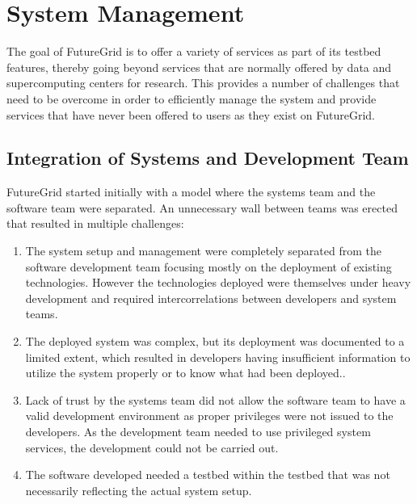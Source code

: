 \documentclass[graybox]{svmult}
\begin{document}



\section{System Management}\label{S:devops}


The goal of FutureGrid is to offer a variety of services as part of its testbed features, thereby going beyond services that are normally offered by data and supercomputing centers for research. This provides a number of challenges that need to be overcome in order to efficiently manage the system and provide services that have never been offered to users as they exist on FutureGrid.


\subsection{Integration of Systems and Development Team}


FutureGrid started initially with a model where the systems team and the software team were separated. An unnecessary wall between teams was erected that resulted in multiple challenges:


\begin{enumerate}


\item The system setup and management were completely separated from the software development team focusing mostly on the deployment of existing technologies. However the technologies deployed were themselves under heavy development and required intercorrelations between developers and system teams.


\item The deployed system was complex, but its deployment was documented to a limited extent, which resulted in developers having insufficient information to utilize the system properly or to know what had been deployed..


\item Lack of trust by the systems team did not allow the software team to have a valid development environment as proper privileges were not issued to the developers. As the development team needed to use privileged system services, the development could not be carried out.


\item The software developed needed a testbed within the testbed that was not necessarily reflecting the actual system setup.


\end{enumerate}
\end{document}
